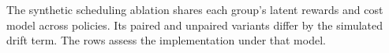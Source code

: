 The synthetic scheduling ablation shares each group's latent rewards and cost model across policies. Its paired and unpaired variants differ by the simulated drift term. The rows assess the implementation under that model.


